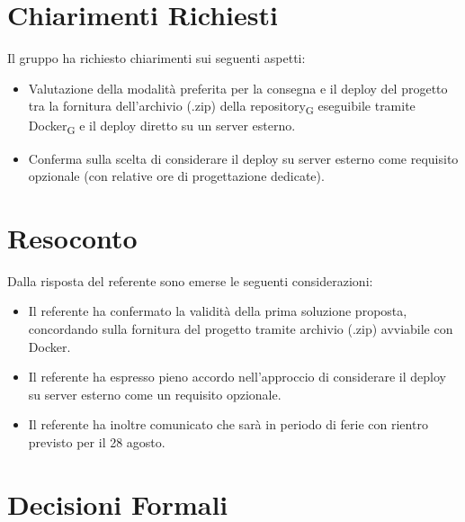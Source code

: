 
\section{Chiarimenti Richiesti}

Il gruppo ha richiesto chiarimenti sui seguenti aspetti:


\begin{itemize}

\item Valutazione della modalità preferita per la consegna e il deploy del progetto tra la fornitura dell'archivio (.zip) della repository\textsubscript{G} eseguibile tramite Docker\textsubscript{G} e il deploy diretto su un server esterno.

\item Conferma sulla scelta di considerare il deploy su server esterno come requisito opzionale (con relative ore di progettazione dedicate).

\end{itemize}



\section{Resoconto}

Dalla risposta del referente sono emerse le seguenti considerazioni:


\begin{itemize}


\item Il referente ha confermato la validità della prima soluzione proposta, concordando sulla fornitura del progetto tramite archivio (.zip) avviabile con Docker.


\item Il referente ha espresso pieno accordo nell'approccio di considerare il deploy su server esterno come un requisito opzionale.


\item Il referente ha inoltre comunicato che sarà in periodo di ferie con rientro previsto per il 28 agosto.

\end{itemize}


\newpage


\section{Decisioni Formali}

